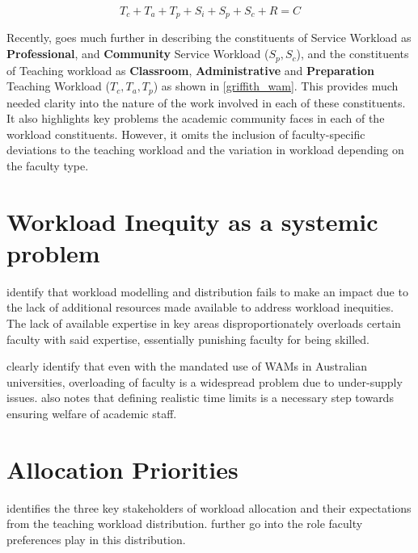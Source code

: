 \begin{enumerate}
          \begin{equation}
              T_c + T_a + T_p + S_i + S_p + S_c+R = C
              \label{griffith_wam}
          \end{equation}

          Recently, \cite{griffith2020framework} goes much further in describing the constituents of Service Workload as \textbf{Professional}, and \textbf{Community} Service Workload (\(S_p, S_c\)), and the constituents of Teaching workload as \textbf{Classroom}, \textbf{Administrative} and \textbf{Preparation} Teaching Workload (\(T_c, T_a, T_p\)) as shown in \autoref{griffith_wam}. This provides much needed clarity into the nature of the work involved in each of these constituents. It also highlights key problems the academic community faces in each of the workload constituents. However, it omits the inclusion of faculty-specific deviations to the teaching workload and the variation in workload depending on the faculty type.

\end{enumerate}

\section{Workload Inequity as a systemic problem}
\cite{jensen2009overload, kenny2014effectiveness} identify that workload modelling and distribution fails to make an impact due to the lack of additional resources made available to address workload inequities. The lack of available expertise in key areas disproportionately overloads certain faculty with said expertise, essentially punishing faculty for being skilled.

\cite{vardi2009impacts, houston2006academic} clearly identify that even with the mandated use of WAMs in Australian universities, overloading of faculty is a widespread problem due to under-supply issues.\cite{kenny2014effectiveness} also notes that defining realistic time limits is a necessary step towards ensuring welfare of academic staff.

\section{Allocation Priorities}

\cite{harwood1975optimizing} identifies the three key stakeholders of workload allocation and their expectations from the teaching workload distribution. \cite{schniederjans1987goal, badri1998multi} further go into the role faculty preferences play in this distribution.

